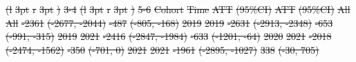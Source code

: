 \documentclass[
  letterpaper,
  DIV=11,
  numbers=noendperiod]{scrartcl}
\providecommand{\DIFdeltex}[1]{{\protect\color{red}\sout{#1}}}                      %
\providecommand{\DIFdelFL}[1]{\DIFdel{#1}} %
\providecommand{\DIFdel}[1]{\texorpdfstring{\DIFdeltex{#1}}{}} %
\begin{document}
\DIFdelFL{(l}%
\DIFdelFL{3pt}%
\DIFdelFL{r}%
\DIFdelFL{3pt}%
\DIFdelFL{)}%
\DIFdelFL{3-4}%
\DIFdelFL{(l}%
\DIFdelFL{3pt}%
\DIFdelFL{r}%
\DIFdelFL{3pt}%
\DIFdelFL{)}%
\DIFdelFL{5-6}%
\DIFdelFL{Cohort }%
\DIFdelFL{Time }%
\DIFdelFL{ATT }%
\DIFdelFL{(95\%CI) }%
\DIFdelFL{ATT }%
\DIFdelFL{(95\%CI)}%
\DIFdelFL{All }%
\DIFdelFL{All }%
\DIFdelFL{-2361 }%
\DIFdelFL{(-2677, -2044) }%
\DIFdelFL{-487 }%
\DIFdelFL{(-805, -168)}%
\DIFdelFL{2019 }%
\DIFdelFL{2019 }%
\DIFdelFL{-2631 }%
\DIFdelFL{(-2913, -2348) }%
\DIFdelFL{-653 }%
\DIFdelFL{(-991, -315)}%
\DIFdelFL{2019 }%
\DIFdelFL{2021 }%
\DIFdelFL{-2416 }%
\DIFdelFL{(-2847, -1984) }%
\DIFdelFL{-633 }%
\DIFdelFL{(-1201, -64)}%
\DIFdelFL{2020 }%
\DIFdelFL{2021 }%
\DIFdelFL{-2018 }%
\DIFdelFL{(-2474, -1562) }%
\DIFdelFL{-350 }%
\DIFdelFL{(-701, 0)}%
\DIFdelFL{2021 }%
\DIFdelFL{2021 }%
\DIFdelFL{-1961 }%
\DIFdelFL{(-2895, -1027) }%
\DIFdelFL{338 }%
\DIFdelFL{(-30, 705)}%
\end{document}
